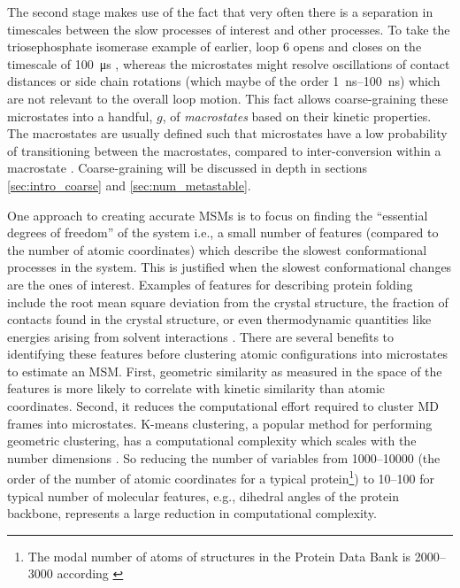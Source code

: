 The second stage makes use of the fact that very often there is a separation in timescales between the slow processes of interest and other processes. To take the triosephosphate isomerase example of earlier, loop 6 opens and closes on the timescale of \SI{100}{\micro\second} \cite{LoopMotionTriosephosphate}, whereas the microstates might resolve oscillations of contact distances or side chain rotations (which maybe of the order \SIrange{1}{100}{\nano\second}) which are not relevant to the overall loop motion. This fact allows coarse-graining these microstates into a handful, $g$, of \emph{macrostates} based on their kinetic properties. The macrostates are usually defined such that microstates have a low probability of transitioning between the macrostates, compared to inter-conversion within a macrostate \cite{schutteDirectApproachConformational1999,swopeDescribingProteinFolding2004, prinzMarkovModelsMolecular2011}. Coarse-graining will be discussed in depth in sections \ref{sec:intro_coarse} and \ref{sec:num_metastable}. 


One approach to creating accurate MSMs is to focus on finding the ``essential degrees of freedom'' of the system \cite{zwanzigClassicalDynamicsContinuous1983a, schutteDirectApproachConformational1999} i.e., a small number of features  (compared to the number of atomic coordinates)  which describe the slowest conformational processes in the system. This is justified when the slowest conformational changes are the ones of interest. Examples of features for describing protein folding include the root mean square deviation from the crystal structure, the fraction of contacts found in the crystal structure, or even thermodynamic quantities like energies arising from solvent interactions \cite{chongExaminingThermodynamicOrder2018}. There are several benefits to identifying these features before clustering atomic configurations into microstates to estimate an MSM. First, geometric similarity as measured in the space of the features is more likely to correlate with kinetic similarity than atomic coordinates.  Second, it reduces the computational effort required to cluster MD frames into microstates. K-means clustering, a popular method for performing geometric clustering, has a computational complexity which scales with the number dimensions \cite{celebiComparativeStudyEfficient2013}. So reducing the number of variables from \numrange[range-phrase=\text{--}]{1000}{10000} (the order of the number of atomic coordinates for a typical protein\footnote{The modal number of atoms of structures in the Protein Data Bank is \numrange[range-phrase=\text{--}]{2000}{3000} according \cite{bankPDBStatisticsPDB}}) to \numrange[range-phrase=\text{--}]{10}{100} for typical number of molecular features, e.g., dihedral angles of the protein backbone, represents a large reduction in computational complexity.



